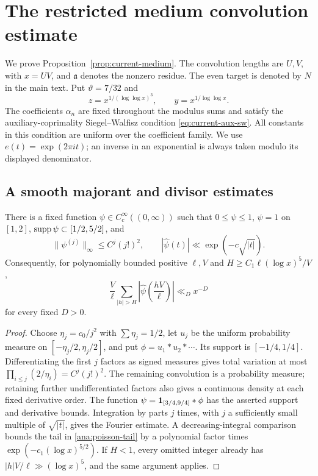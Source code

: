 \section{The restricted medium convolution estimate}
\label{app:medium}

We prove Proposition~\ref{prop:current-medium}. The convolution lengths
are $U,V$, with $x=UV$, and $\mathfrak{a}$ denotes the nonzero residue.
The even target is denoted by $N$ in the main text.
Put $\vartheta=7/32$ and
\[
 z=x^{1/(\log\log x)^3},\qquad y=x^{1/\log\log x}.
\]
The coefficients $\alpha_n$ are fixed throughout the modulus sums and
satisfy the auxiliary-coprimality Siegel--Walfisz condition
\eqref{eq:current-aux-sw}.
All constants in this condition are uniform over the coefficient family.
We use $e(t)=\exp(2\pi it)$; an inverse in an exponential is always taken
modulo its displayed denominator.

\subsection{A smooth majorant and divisor estimates}

\begin{lemma}\label{ana:majorant}
There is a fixed function $\psi\in C_c^\infty((0,\infty))$ such that
$0\le\psi\le1$, $\psi=1$ on $[1,2]$, $\operatorname{supp}\psi\subset[1/2,5/2]$, and
\[
 \|\psi^{(j)}\|_\infty\le C^j(j!)^2,
 \qquad |\widehat\psi(t)|\ll \exp(-c\sqrt{|t|}).
\]
Consequently, for polynomially bounded positive $\ell,V$ and
$H\ge C_1\ell(\log x)^5/V$,
\begin{equation}
 \frac V\ell\sum_{|h|>H}
       \left|\widehat\psi\left(\frac{hV}{\ell}\right)\right|
       \ll_D x^{-D}
 \label{ana:poisson-tail}
\end{equation}
for every fixed $D>0$.
\end{lemma}

\begin{proof}
Choose $\eta_j=c_0/j^2$ with $\sum \eta_j=1/2$, let $u_j$ be the uniform
probability measure on $[-\eta_j/2,\eta_j/2]$, and put
$\phi=u_1*u_2*\cdots$. Its support is $[-1/4,1/4]$. Differentiating
the first $j$ factors as signed measures gives total variation at most
$\prod_{i\le j}(2/\eta_i)=C^j(j!)^2$. The remaining convolution is a
probability measure; retaining further undifferentiated factors also
gives a continuous density at each fixed derivative order. The function
$\psi=\mathbf 1_{[3/4,9/4]}*\phi$ has the asserted support and derivative
bounds. Integration by parts $j$ times, with $j$ a sufficiently small
multiple of $\sqrt{|t|}$, gives the Fourier estimate. A decreasing-integral
comparison bounds the tail in \eqref{ana:poisson-tail} by a polynomial
factor times $\exp(-c_1(\log x)^{5/2})$. If $H<1$, every omitted integer
already has $|h|V/\ell\gg(\log x)^5$, and the same argument applies.
\end{proof}

